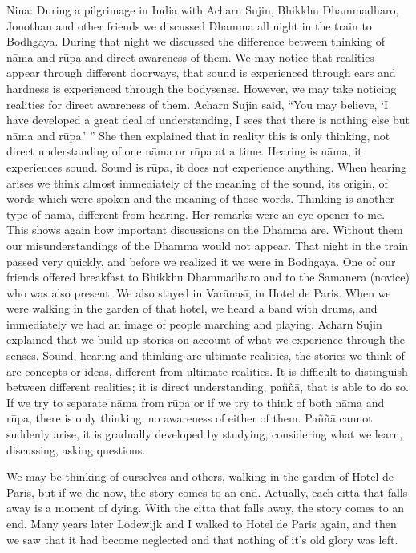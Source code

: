 Nina: During a pilgrimage in India with Acharn Sujin, Bhikkhu Dhammadharo, Jonothan and other friends we discussed Dhamma all night in the train to Bodhgaya. During that night we discussed the difference between thinking of nāma and rūpa and direct awareness of them. We may notice that realities appear through different doorways, that sound is experienced through ears and hardness is experienced through the bodysense. However, we may take noticing realities for direct awareness of them. Acharn Sujin said, ``You may believe, ‘I have developed a great deal of understanding, I sees that there is nothing else but nāma and rūpa.' '' She then explained that in reality this is only thinking, not direct understanding of one nāma or rūpa at a time. Hearing is nāma, it experiences sound. Sound is rūpa, it does not experience anything. When hearing arises we think almost immediately of the meaning of the sound, its origin, of words which were spoken and the meaning of those words. Thinking is another type of nāma, different from hearing. Her remarks were an eye-opener to me. This shows again how important discussions on the Dhamma are. Without them our misunderstandings of the Dhamma would not appear. That night in the train passed very quickly, and before we realized it we were in Bodhgaya. One of our friends offered breakfast to Bhikkhu Dhammadharo and to the Samanera (novice) who was also present.
We also stayed in Varānasī, in Hotel de Paris. When we were walking in the garden of that hotel, we heard a band with drums, and immediately we had an image of people marching and playing. Acharn Sujin explained that we build up stories on account of what we experience through the senses. Sound, hearing and thinking are ultimate realities, the stories we think of are concepts or ideas, different from ultimate realities. It is difficult to distinguish between different realities; it is direct understanding, paññā, that is able to do so. If we try to separate nāma from rūpa or if we try to think of both nāma and rūpa, there is only thinking, no awareness of either of them. Paññā cannot suddenly arise, it is gradually developed by studying, considering what we learn, discussing, asking questions.

We may be thinking of ourselves and others, walking in the garden of Hotel de Paris, but if we die now, the story comes to an end. Actually, each citta that falls away is a moment of dying. With the citta that falls away, the story comes to an end. Many years later Lodewijk and I walked to Hotel de Paris again, and then we saw that it had become neglected and that nothing of it’s old glory was left.

